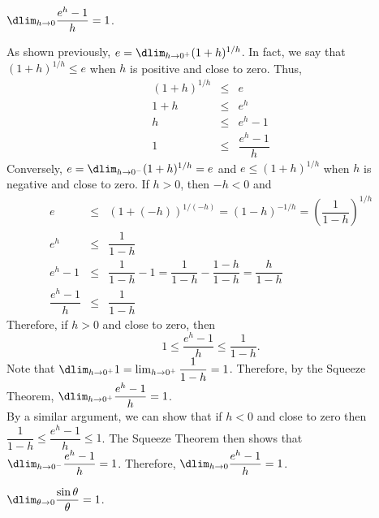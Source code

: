 \documentclass{book}
\begin{document}
\begin{Prop}\label{exlimit} $\dlim_{h\to 0} \dfrac{e^h-1}{h} = 1$.\end{Prop}
\begin{pf}
As shown previously, $e = \dlim_{h\to 0^+} (1+h)^{1/h}$. In fact, we say that $(1+h)^{1/h} \le e$ when $h$ is positive and close to zero. Thus, 
\begin{eqnarray*}
(1+h)^{1/h} &\le& e\\
1+h &\le& e^h\\
h &\le& e^h-1\\
1 &\le& \dfrac{e^h-1}{h}
\end{eqnarray*} Conversely, $e = \dlim_{h\to 0^-} (1+h)^{1/h} = e$ and $e \le (1+h)^{1/h}$ when $h$ is negative and close to zero.  If $h>0$, then $-h<0$ and  
\begin{eqnarray*}
e &\le& (1+(-h))^{1/(-h)} =(1-h)^{-1/h} =\left(\dfrac{1}{1-h}\right)^{1/h}\\
e^h &\le& \dfrac{1}{1-h}\\
e^h-1&\le & \dfrac{1}{1-h} -1 =  \dfrac{1}{1-h} - \dfrac{1-h}{1-h} = \dfrac{h}{1-h}\\
\dfrac{e^h-1}{h} &\le& \dfrac{1}{1-h} 
\end{eqnarray*} Therefore, if $h>0$ and close to zero, then \[1\le \dfrac{e^h-1}{h} \le \dfrac{1}{1-h}.\] Note that $\dlim_{h\to 0^+} 1 = \lim_{h\to 0^+} \dfrac{1}{1-h} = 1$. Therefore, by the Squeeze Theorem, $\dlim_{h\to 0^+} \dfrac{e^h-1}{h} = 1$.\\

By a similar argument, we can show that if $h<0$ and close to zero then $\dfrac{1}{1-h} \le \dfrac{e^h-1}{h} \le 1$. The Squeeze Theorem then shows that $\dlim_{h\to0^-} \dfrac{e^h-1}{h} = 1$. Therefore, $\dlim_{h\to 0} \dfrac{e^h-1}{h} = 1$.
\end{pf}\vs

\begin{Prop} $\dlim_{\theta\to 0} \dfrac{\sin \theta}{\theta} = 1$.\end{Prop}
\end{document}

